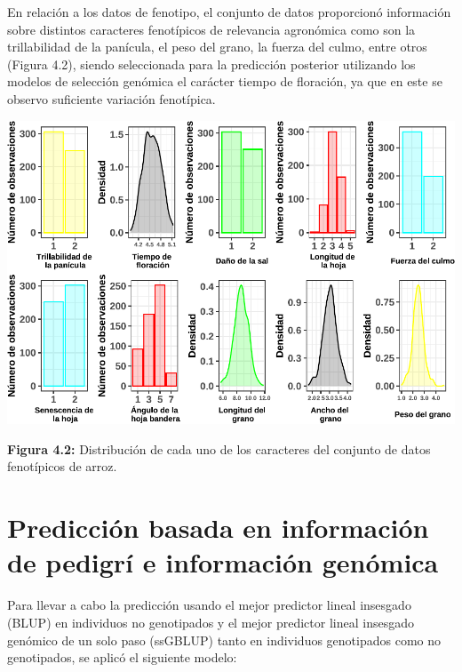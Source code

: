 \documentclass[11pt,spanish,a4paper,oneside,]{book} %
\begin{document}
En relación a los datos de fenotipo, el conjunto de datos proporcionó información sobre distintos caracteres fenotípicos de relevancia agronómica como son la trillabilidad de la panícula, el peso del grano, la fuerza del culmo, entre otros (Figura 4.2), siendo seleccionada para la predicción posterior utilizando los modelos de selección genómica el carácter tiempo de floración, ya que en este se observo suficiente variación fenotípica.

\begin{center}\includegraphics[width=1\linewidth]{figures/Graf_feno} \end{center}

\begin{center}
\textbf{Figura 4.2:} Distribución de cada uno de los caracteres del conjunto de datos fenotípicos de arroz.

\end{center}

\hypertarget{predicciuxf3n-basada-en-informaciuxf3n-de-pedigruxed-e-informaciuxf3n-genuxf3mica}{%
\section{Predicción basada en información de pedigrí e información genómica}\label{predicciuxf3n-basada-en-informaciuxf3n-de-pedigruxed-e-informaciuxf3n-genuxf3mica}}

Para llevar a cabo la predicción usando el mejor predictor lineal insesgado (BLUP) en individuos no genotipados y el mejor predictor lineal insesgado genómico de un solo paso (ssGBLUP) tanto en individuos genotipados como no genotipados, se aplicó el siguiente modelo:
\end{document}
